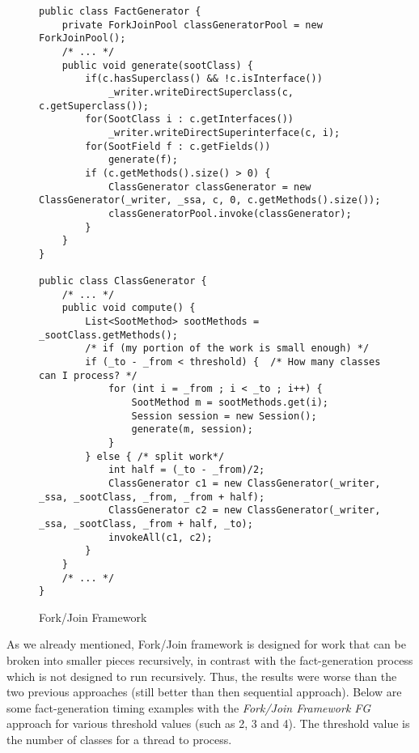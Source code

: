 \documentclass{dithesis}
\begin{document}
        \begin{figure}[H]
\begin{lstlisting}
public class FactGenerator {
    private ForkJoinPool classGeneratorPool = new ForkJoinPool();
    /* ... */
    public void generate(sootClass) {
        if(c.hasSuperclass() && !c.isInterface())
            _writer.writeDirectSuperclass(c, c.getSuperclass());
        for(SootClass i : c.getInterfaces())
            _writer.writeDirectSuperinterface(c, i);
        for(SootField f : c.getFields())
            generate(f);
        if (c.getMethods().size() > 0) {
            ClassGenerator classGenerator = new ClassGenerator(_writer, _ssa, c, 0, c.getMethods().size());
            classGeneratorPool.invoke(classGenerator);
        }
    }
}

public class ClassGenerator {
    /* ... */
    public void compute() {
        List<SootMethod> sootMethods = _sootClass.getMethods();
        /* if (my portion of the work is small enough) */
        if (_to - _from < threshold) {  /* How many classes can I process? */
            for (int i = _from ; i < _to ; i++) {
                SootMethod m = sootMethods.get(i);
                Session session = new Session();
                generate(m, session);
            }
        } else { /* split work*/
            int half = (_to - _from)/2;
            ClassGenerator c1 = new ClassGenerator(_writer, _ssa, _sootClass, _from, _from + half);
            ClassGenerator c2 = new ClassGenerator(_writer, _ssa, _sootClass, _from + half, _to);
            invokeAll(c1, c2);
        }
    }
    /* ... */
}
\end{lstlisting}
        \caption{Fork/Join Framework}
        \end{figure}
        As we already mentioned, Fork/Join framework is designed for work that can be broken into smaller pieces recursively, in contrast with the fact-generation process which is not designed to run recursively. Thus, the results were worse than the two previous approaches (still better than then sequential approach). Below are some fact-generation timing examples with the \textit{Fork/Join Framework FG} approach for various threshold values (such as 2, 3 and 4). The threshold value is the number of classes for a thread to process.
\end{document}
